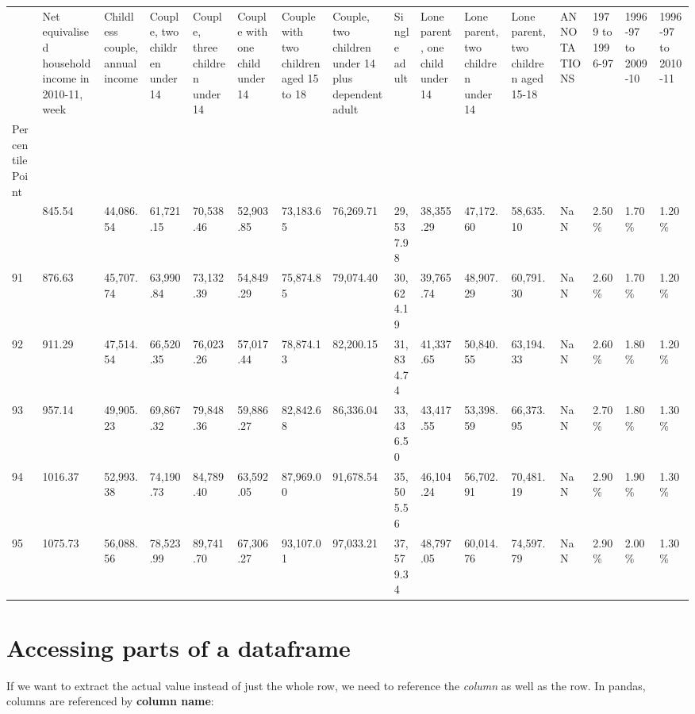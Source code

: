 \documentclass[
  letterpaper,
  DIV=11,
  numbers=noendperiod]{scrreprt}
\begin{document}
\begin{longtable}[]{@{}llllllllllllllll@{}}
\toprule\noalign{}
& Net equivalised household income in 2010-11, week & Childless couple,
annual income & Couple, two children under 14 & Couple, three children
under 14 & Couple with one child under 14 & Couple with two children
aged 15 to 18 & Couple, two children under 14 plus dependent adult &
Single adult & Lone parent, one child under 14 & Lone parent, two
children under 14 & Lone parent, two children aged 15-18 & ANNOTATIONS &
1979 to 1996-97 & 1996-97 to 2009-10 & 1996-97 to 2010-11 \\
Percentile Point & & & & & & & & & & & & & & & \\
\midrule\noalign{}
\endhead
\bottomrule\noalign{}
\endlastfoot
90 & 845.54 & 44,086.54 & 61,721.15 & 70,538.46 & 52,903.85 & 73,183.65
& 76,269.71 & 29,537.98 & 38,355.29 & 47,172.60 & 58,635.10 & NaN &
2.50\% & 1.70\% & 1.20\% \\
91 & 876.63 & 45,707.74 & 63,990.84 & 73,132.39 & 54,849.29 & 75,874.85
& 79,074.40 & 30,624.19 & 39,765.74 & 48,907.29 & 60,791.30 & NaN &
2.60\% & 1.70\% & 1.20\% \\
92 & 911.29 & 47,514.54 & 66,520.35 & 76,023.26 & 57,017.44 & 78,874.13
& 82,200.15 & 31,834.74 & 41,337.65 & 50,840.55 & 63,194.33 & NaN &
2.60\% & 1.80\% & 1.20\% \\
93 & 957.14 & 49,905.23 & 69,867.32 & 79,848.36 & 59,886.27 & 82,842.68
& 86,336.04 & 33,436.50 & 43,417.55 & 53,398.59 & 66,373.95 & NaN &
2.70\% & 1.80\% & 1.30\% \\
94 & 1016.37 & 52,993.38 & 74,190.73 & 84,789.40 & 63,592.05 & 87,969.00
& 91,678.54 & 35,505.56 & 46,104.24 & 56,702.91 & 70,481.19 & NaN &
2.90\% & 1.90\% & 1.30\% \\
95 & 1075.73 & 56,088.56 & 78,523.99 & 89,741.70 & 67,306.27 & 93,107.01
& 97,033.21 & 37,579.34 & 48,797.05 & 60,014.76 & 74,597.79 & NaN &
2.90\% & 2.00\% & 1.30\% \\
\end{longtable}

\hypertarget{accessing-parts-of-a-dataframe}{%
\section{Accessing parts of a
dataframe}\label{accessing-parts-of-a-dataframe}}

If we want to extract the actual value instead of just the whole row, we
need to reference the \emph{column} as well as the row. In pandas,
columns are referenced by \textbf{column name}:
\end{document}
